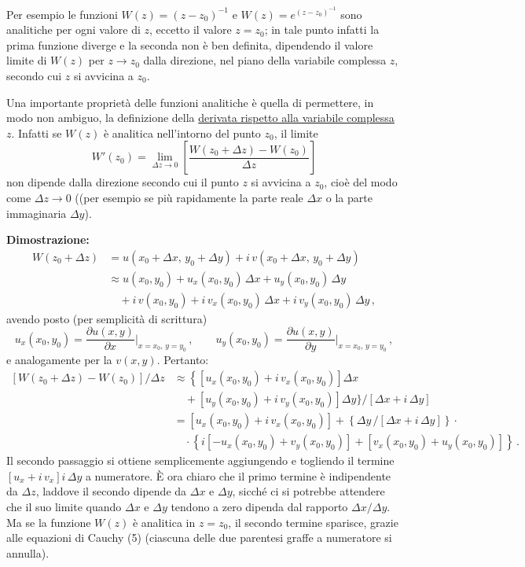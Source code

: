 \documentclass[11pt, a4paper]{book}
\numberwithin{equation}{section}
\begin{document}
Per esempio le funzioni $W(z) = (z - z_0)^{-1}$ e $W(z) = e^{(z-z_0)^{-1}}$ sono analitiche per ogni valore di $z$, eccetto il valore $z = z_0$; in tale punto infatti la prima funzione diverge e la seconda non è ben definita, dipendendo il valore limite di $W(z)$ per $z \to z_0$ dalla direzione, nel piano della variabile complessa $z$, secondo cui $z$ si avvicina a $z_0$.

Una importante proprietà delle funzioni analitiche è quella di permettere, in modo non ambiguo, la definizione della \underline{derivata rispetto alla variabile complessa $z$}. Infatti se $W(z)$ è analitica nell'intorno del punto $z_0$, il limite
\begin{equation}
W'(z_0) = \lim_{\Delta z \to 0}\left[\frac{W(z_0 + \Delta z) - W(z_0)}{\Delta z}\right] \tag{7}
\end{equation}
non dipende dalla direzione secondo cui il punto $z$ si avvicina a $z_0$, cioè del modo come $\Delta z \to 0$ ((per esempio se più rapidamente la parte reale $\Delta x$ o la parte immaginaria $\Delta y$).


\noindent\textbf{Dimostrazione:}
\begin{align*}
W(z_0 + \Delta z) &= u(x_0 + \Delta x,\, y_0 + \Delta y) + i\,v(x_0 + \Delta x,\, y_0 + \Delta y) \\
&\approx u(x_0, y_0) + u_x(x_0, y_0)\,\Delta x + u_y(x_0, y_0)\,\Delta y \\
&\quad + i\,v(x_0, y_0) + i\,v_x(x_0, y_0)\,\Delta x + i\,v_y(x_0, y_0)\,\Delta y\,,
\end{align*}
avendo posto (per semplicità di scrittura)
\[
u_x(x_0, y_0) = \frac{\partial u(x,y)}{\partial x}\bigg|_{x=x_0,\,y=y_0}\,, \qquad
u_y(x_0, y_0) = \frac{\partial u(x,y)}{\partial y}\bigg|_{x=x_0,\,y=y_0}\,,
\]
e analogamente per la $v(x,y)$. Pertanto:
\begin{align*}
\left[W(z_0+\Delta z) - W(z_0)\right]/\Delta z &\approx \left\{\left[u_x(x_0,y_0) + i\,v_x(x_0,y_0)\right]\Delta x\right. \\
&\quad + \left[u_y(x_0,y_0) + i\,v_y(x_0,y_0)\right]\Delta y\Big\}/[\Delta x + i\,\Delta y] \\
&= \left[u_x(x_0,y_0) + i\,v_x(x_0,y_0)\right] + \left\{\Delta y\,/[\Delta x + i\,\Delta y]\right\}\cdot \\
&\quad \cdot\left\{i\left[-u_x(x_0,y_0) + v_y(x_0,y_0)\right] + \left[v_x(x_0,y_0) + u_y(x_0,y_0)\right]\right\}\,.
\end{align*}
Il secondo passaggio si ottiene semplicemente aggiungendo e togliendo il termine $\left[u_x + i\,v_x\right]i\,\Delta y$ a numeratore. È ora chiaro che il primo termine è indipendente da $\Delta z$, laddove il secondo dipende da $\Delta x$ e $\Delta y$, sicché ci si potrebbe attendere che il suo limite quando $\Delta x$ e $\Delta y$ tendono a zero dipenda dal rapporto $\Delta x/\Delta y$. Ma se la funzione $W(z)$ è analitica in $z = z_0$, il secondo termine sparisce, grazie alle equazioni di Cauchy (5) (ciascuna delle due parentesi graffe a numeratore si annulla).
\end{document}
